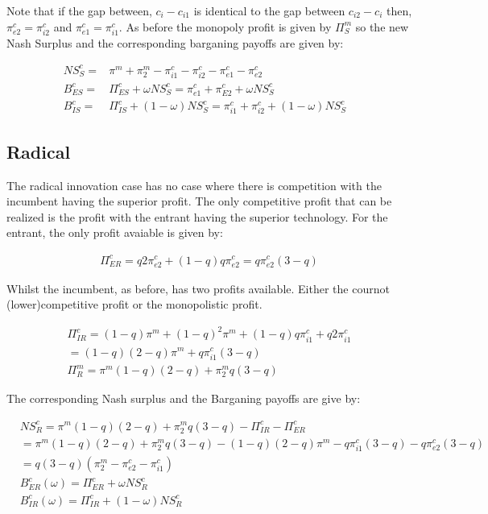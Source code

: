 \documentclass[11pt]{article}
\begin{document}
Note that if the gap between, $c_i-c_{i1}$ is identical to the gap between $c_{i2}-c_i$ then, $\pi_{e2}^{c}=\pi_{i2}^{c}$ and $\pi_{e1}^{c}=\pi_{i1}^{c}$. As before the monopoly profit is given by $\Pi_{S}^{m}$ so the new Nash Surplus and the corresponding barganing payoffs are given by:

\begin{align*}
NS_{S}^{c} = &\pi^m+\pi^m_{2}- \pi_{i1}^{c}-\pi_{i2}^{c}-\pi_{e1}^{c}-\pi_{e2}^{c} &\\
B_{ES}^{c} = &\Pi_{ES}^{c} + \omega NS_{S}^{c} 
= \pi_{e1}^{c}+\pi_{E2}^{c} +  \omega NS_{S}^{c}& \\
B_{IS}^{c} = &\Pi_{IS}^{c}+ (1-\omega) NS_{S}^{c} = \pi_{i1}^{c}+\pi_{i2}^{c}+ (1-\omega) NS_{S}^{c} &
\end{align*}


\subsection*{Radical}

The radical innovation case has no case where there is competition with the incumbent having the superior profit. The only competitive profit that can be realized is the profit with the entrant having the superior technology. For the entrant, the only profit avaiable is given by: 

\begin{align*}
\Pi_{ER}^{c} = q 2 \pi_{e2}^{c} + (1-q) q \pi_{e2}^{c} =  q \pi_{e2}^{c} (3-q)
\end{align*}

Whilst the incumbent, as before, has two profits available. Either the cournot (lower)competitive profit or the  monopolistic profit. 

\begin{align*}
&\Pi_{IR}^{c} = (1-q) \pi^{m} + (1-q)^2\pi^{m} + (1-q)q \pi_{i1}^{c} + q 2 \pi_{i1}^{c}& \\
&= (1-q) (2-q)\pi^{m}  + q \pi_{i1}^{c}(3-q)& \\
&\Pi_{R}^{m} = \pi^{m} (1-q) (2-q)+\pi_{2}^{m} q (3-q)&
\end{align*}

The corresponding Nash surplus and the Barganing payoffs are give by: 

\begin{align*}
&NS_{R}^{c} = \pi^{m} (1-q) (2-q)+\pi_{2}^{m} q (3-q)- \Pi_{IR}^{c} - \Pi_{ER}^{c}& \\
&=\pi^{m} (1-q) (2-q)+\pi_{2}^{m} q (3-q)
- (1-q) (2-q)\pi^{m}
- q \pi_{i1}^{c}(3-q) 
- q \pi_{e2}^{c} (3-q)& \\
&= q(3-q) (\pi_{2}^{m}-\pi_{e2}^{c}-\pi_{i1}^{c})& \\
&B_{ER}^{c}(\omega) = \Pi_{ER}^{c} + \omega NS_{R}^{c}& \\
&B_{IR}^{c}(\omega) = \Pi_{IR}^{c} + (1-\omega) NS_{R}^{c} &
\end{align*}
\end{document}
